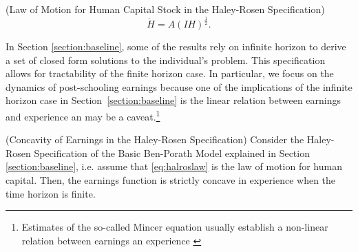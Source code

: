 \begin{definition} (Law of Motion for Human Capital Stock in the Haley-Rosen Specification)
\begin{equation}
\dot{H} = A \left( IH \right)^{\frac{1}{2}} \label{eq:halroslaw}.
\end{equation}
\end{definition}

\indent In Section \ref{section:baseline}, some of the results rely on infinite horizon to derive a set of closed form solutions to the individual's problem. This specification allows for tractability of the finite horizon case. In particular, we focus on the dynamics of post-schooling earnings because one of the implications of the infinite horizon case in Section~\ref{section:baseline} is the linear relation between earnings and experience an may be a caveat.\footnote{Estimates of the so-called Mincer equation usually establish a non-linear relation between earnings an experience \citep[see][]{heckman2006earnings}}\\

\begin{claim} \label{claim:concavehalros} (Concavity of Earnings in the Haley-Rosen Specification)
Consider the Haley-Rosen Specification of the Basic Ben-Porath Model explained in Section \ref{section:baseline}, i.e. assume that \eqref{eq:halroslaw} is the law of motion for human capital. Then, the earnings function is strictly concave in experience when the time horizon is finite.
\end{claim}

